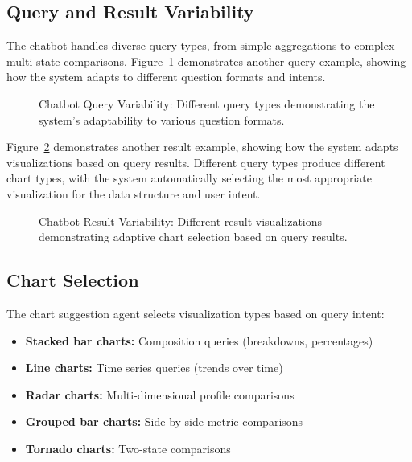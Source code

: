 \subsection{Query and Result Variability}

The chatbot handles diverse query types, from simple aggregations to complex multi-state comparisons. Figure~\ref{fig:chatbot_query2} demonstrates another query example, showing how the system adapts to different question formats and intents.

\begin{figure}[htbp]
\centering

\caption{Chatbot Query Variability: Different query types demonstrating the system's adaptability to various question formats.}
\label{fig:chatbot_query2}
\end{figure}

Figure~\ref{fig:chatbot_result2} demonstrates another result example, showing how the system adapts visualizations based on query results. Different query types produce different chart types, with the system automatically selecting the most appropriate visualization for the data structure and user intent.

\begin{figure}[htbp]
    \centering

\caption{Chatbot Result Variability: Different result visualizations demonstrating adaptive chart selection based on query results.}
\label{fig:chatbot_result2}
    \end{figure}

\subsection{Chart Selection}

The chart suggestion agent selects visualization types based on query intent:

\begin{itemize}
\item \textbf{Stacked bar charts:} Composition queries (breakdowns, percentages)
\item \textbf{Line charts:} Time series queries (trends over time)
\item \textbf{Radar charts:} Multi-dimensional profile comparisons
\item \textbf{Grouped bar charts:} Side-by-side metric comparisons
\item \textbf{Tornado charts:} Two-state comparisons
\end{itemize}

